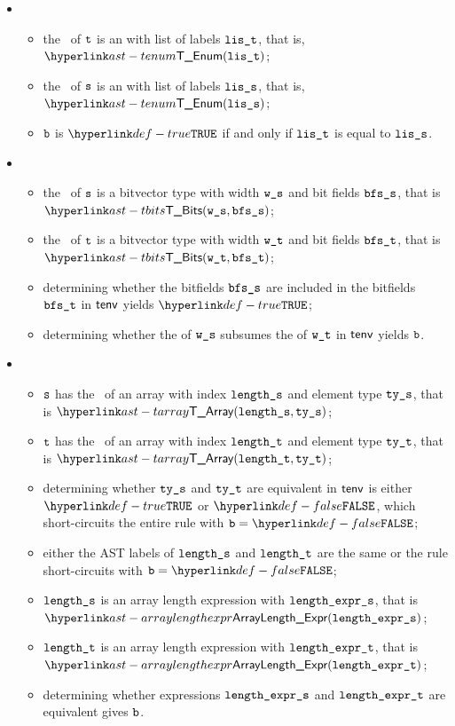 \begin{itemize}
\item {}
  \begin{itemize}
  \item the \underlyingtype\ of $\texttt{t}$ is an \enumerationtypeterm{} with list of labels $\texttt{lis\_t}$, that is, $\TEnum(\vlit)$;
  \item the \underlyingtype\ of $\texttt{s}$ is an \enumerationtypeterm{} with list of labels $\texttt{lis\_s}$, that is, $\TEnum(\vlis)$;
  \item $\texttt{b}$ is $\True$ if and only if $\texttt{lis\_t}$ is equal to $\texttt{lis\_s}$.
  \end{itemize}

\item {}
  \begin{itemize}
  \item the \underlyingtype\ of $\texttt{s}$ is a bitvector type with width $\texttt{w\_s}$ and bit fields $\texttt{bfs\_s}$, that is $\TBits(\ws, \bfss)$;
  \item the \underlyingtype\ of $\texttt{t}$ is a bitvector type with width $\texttt{w\_t}$ and bit fields $\texttt{bfs\_t}$, that is $\TBits(\wt, \bfst)$;
  \item determining whether the bitfields $\texttt{bfs\_s}$ are included in the bitfields $\texttt{bfs\_t}$ in $\textsf{tenv}$ yields $\True$\ProseOrTypeError;
  \item determining whether the \symbolicdomain{} of $\texttt{w\_s}$ subsumes the \symbolicdomain{} of $\texttt{w\_t}$ in $\textsf{tenv}$ yields $\texttt{b}$.
  \end{itemize}

\item {}
  \begin{itemize}
  \item $\texttt{s}$ has the \underlyingtype\ of an array with index $\texttt{length\_s}$ and element type $\texttt{ty\_s}$, that is $\TArray(\vlengths, \vtys)$;
  \item $\texttt{t}$ has the \underlyingtype\ of an array with index $\texttt{length\_t}$ and element type $\texttt{ty\_t}$, that is $\TArray(\vlengtht, \vtyt)$;
  \item determining whether $\texttt{ty\_s}$ and $\texttt{ty\_t}$ are equivalent in $\textsf{tenv}$ is either $\True$
  or $\False$, which short-circuits the entire rule with $\vb=\False$;
  \item either the AST labels of $\texttt{length\_s}$ and $\texttt{length\_t}$ are the same or the rule short-circuits with $\vb=\False$;
  \item $\texttt{length\_s}$ is an array length expression with $\texttt{length\_expr\_s}$, that is \\ $\ArrayLengthExpr(\vlengthexprs)$;
  \item $\texttt{length\_t}$ is an array length expression with $\texttt{length\_expr\_t}$, that is \\ $\ArrayLengthExpr(\vlengthexprt)$;
  \item determining whether expressions $\texttt{length\_expr\_s}$ and $\texttt{length\_expr\_t}$ are equivalent gives $\texttt{b}$.
  \end{itemize}


\end{itemize}
